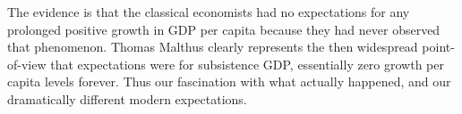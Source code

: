\documentclass[12pt]{article}
\numberwithin{equation}{section}
\begin{document}
		The evidence is that the classical economists had no expectations for any prolonged positive growth in GDP per capita because they had never observed that phenomenon. Thomas Malthus clearly represents the then widespread point-of-view that expectations were for subsistence GDP, essentially zero growth per capita levels forever. Thus our fascination with what actually happened, and our dramatically different modern expectations.
		

\end{document}
